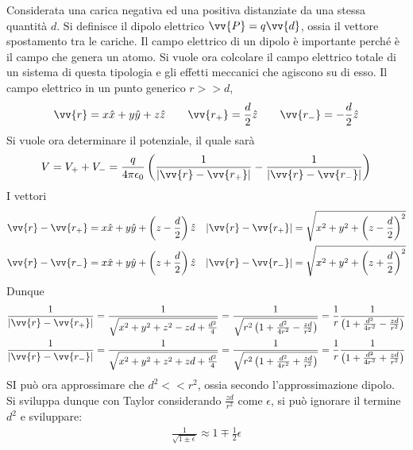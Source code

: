 \documentclass[a4paper, oneside]{article}
\begin{document}
Considerata una carica negativa ed una positiva distanziate da una stessa quantità $d$. Si definisce il dipolo elettrico 
$\vv{P} = q\vv{d}$, ossia il vettore spostamento tra le cariche. Il campo elettrico di un dipolo è importante perché è il campo che 
genera un atomo. Si vuole ora colcolare il campo elettrico totale di un sistema di questa tipologia e gli effetti meccanici che
agiscono su di esso. Il campo elettrico in un punto generico $r >> d$, 
\begin{gather*}
    \vv{r} = x\hat{x} + y\hat{y} + z\hat{z} \qquad \vv{r_+} = \frac{d}{2} \hat{z} \qquad \vv{r_-} = - \frac{d}{2}\hat{z}        
\end{gather*}
Si vuole ora determinare il potenziale, il quale sarà 
\begin{gather*}
    V = V_+ + V_- = \frac{q}{4\pi\epsilon_0} \left(\frac{1}{\left| \vv{r} - \vv{r_+}   \right| } - \frac{1}{\left| \vv{r} - \vv{r_-}   \right| }\right)
\end{gather*}
I vettori 
\begin{align*}
    \vv{r} - \vv{r_+} &= x\hat{x} + y\hat{y} + \left(z - \frac{d}{2}\right)    \hat{z}  &\left| \vv{r} - \vv{r_+}   \right| = \sqrt{ x^{2} + y^{2} + \left(z - \frac{d}{2}\right)^{2}} \\
    \vv{r} - \vv{r_-} &= x\hat{x} + y\hat{y} + \left(z + \frac{d}{2}\right) \hat{z}      &\left| \vv{r} - \vv{r_-}  \right| = \sqrt{x^{2} + y^{2} + \left(z + \frac{d}{2}\right)^{2}} 
\end{align*}
Dunque
\begin{gather*}
    \frac{1}{\left| \vv{r} - \vv{r_+}   \right| } = \frac{1}{\sqrt{x^{2} + y^{2} + z^{2} - zd + \frac{d^{2}}{4}} } = \frac{1}{\sqrt{r^{2} \left(1 + \frac{d^{2}}{4r^{2}} - \frac{zd}{r^{2}}\right) }} =  \frac{1}{r} \frac{1}{\left(1 + \frac{d^{2}}{4r^{2}} - \frac{zd}{r^{2}}\right)} \\
    \frac{1}{\left| \vv{r} - \vv{r_-}   \right| } = \frac{1}{\sqrt{x^{2} + y^{2} + z^{2} + zd + \frac{d^{2}}{4}} } = \frac{1}{\sqrt{r^{2} \left(1 + \frac{d^{2}}{4r^{2}} + \frac{zd}{r^{2}}\right) }} =  \frac{1}{r} \frac{1}{\left(1 + \frac{d^{2}}{4r^{2}} + \frac{zd}{r^{2}}\right)} 
\end{gather*}
SI può ora approssimare che $d^{2} << r^{2}$, ossia secondo l'approssimazione dipolo. Si sviluppa dunque 
con Taylor considerando $\frac{zd}{r^{2}}$ come $\epsilon$, si può ignorare il termine $d^{2}$ e sviluppare:
\begin{gather*}
    \frac{1}{\sqrt{1 \pm \epsilon} } \approx 1 \mp \frac{1}{2}\epsilon 
\end{gather*}
\end{document}
